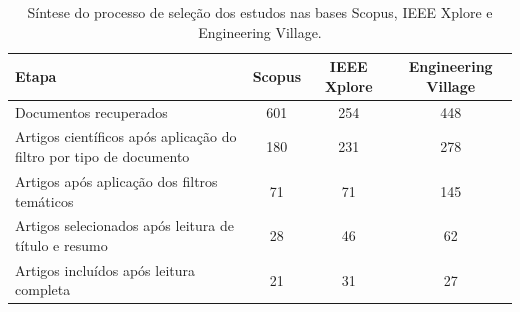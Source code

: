 \begin{table}[H]

\centering

\begin{tabular}{|p{7cm}|c|c|c|}

\hline

Etapa & Scopus & IEEE Xplore & Engineering Village \\ \hline

Documentos recuperados & 601 & 254 & 448 \\ \hline

Artigos científicos após aplicação do filtro por tipo de documento & 180 & 231 & 278 \\ \hline

Artigos após aplicação dos filtros temáticos & 71 & 71 & 145 \\ \hline

Artigos selecionados após leitura de título e resumo & 28 & 46 & 62 \\ \hline

Artigos incluídos após leitura completa & 21 & 31 & 27 \\ \hline

\end{tabular}

\caption{Síntese do processo de seleção dos estudos nas bases Scopus, IEEE Xplore e Engineering Village.}

\label{tab:processoSelecao}

\end{table}